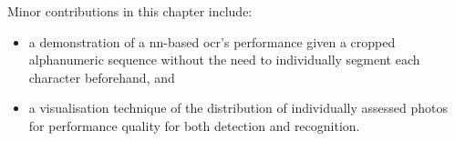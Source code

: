 \noindent
Minor contributions in this chapter include:

\begin{itemize}
  \item a demonstration of a \gls{nn}-based \gls{ocr}'s performance given a cropped alphanumeric sequence without the need to individually segment each character beforehand, and
  \item a visualisation technique of the distribution of individually assessed photos for performance quality for both detection and recognition.
\end{itemize}





